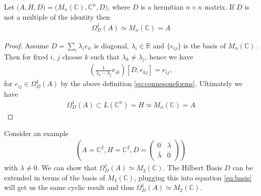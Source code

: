 \begin{mylemma}
    Let $\big(A, H, D\big) = \big(M_n(\mathbb{C}), \mathbb{C}^n, D\big)$, where
    $D$ is a hermitian $n\times n$ matrix. If $D$ is not a multiple of the
    identity then
    \begin{align}
        \Omega _D ^1 (A)  \simeq  M_n(\mathbb{C}) = A
    \end{align}
\end{mylemma}
\begin{proof}
    Assume $D = \sum _i \lambda _i e_{ii}$ is diagonal, $\lambda _i \in \mathbb{R}$ and
    $\{e_{ij}\}$ is the basis of $M_n(\mathbb{C})$. Then for fixed $i$, $j$ choose $k$
    such that $\lambda _k \neq \lambda _j$, hence we have
    \begin{align} \label{eq:basis}
        \left(\frac{1}{\lambda _k - \lambda _j} e_{ik}\right) [D, e_{kj}] =
        e_{ij},
    \end{align}
    for $e_{ij}\in \Omega _D ^1 (A)$ by the above definition
    \eqref{eq:connesoneforms}. Ultimately we have
    \begin{align}
        \Omega _D ^1
    (A) \subset L(\mathbb{C}^n) = H \simeq M_n(\mathbb{C}) = A
    \end{align}
\end{proof}

Consider an example
\begin{align}
     \left(A=\mathbb{C}^2, H=\mathbb{C}^2,
         D = \begin{pmatrix} 0 & \lambda \\ \bar{\lambda} & 0
 \end{pmatrix}\right)
\end{align}
with $\lambda \neq 0$. We can show that $\Omega _D^1(A)
\simeq M_2(\mathbb{C})$. The Hilbert Basis $D$ can be extended in terms of
the basis of $M_2(\mathbb{C})$, plugging this into equation
\eqref{eq:basis} will get us the same cyclic result and thus
$\Omega _D^1(A) \simeq M_2(\mathbb{C})$.

